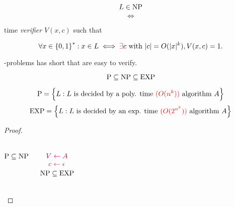 
\begin{frame}
  \begin{definition}[\np]
	\[
	  L \in \text{NP}
	\]
	\[
	  \iff
	\]
	\begin{center}
	  \red{$\exists$}  time \emph{verifier} $V(x,c)$ such that
	\end{center}
	\[
	  \forall x \in \left\{ 0,1 \right\}^{\ast}: x \in L \iff \textcolor{red}{\exists} c \text{ with } |c| = O(|x|^{k}), V(x,c) = 1.
	\]
  \end{definition}

  \vspace{0.50cm}
  \begin{center}
	{\large \np-problems has short  that are easy to verify.}
  \end{center}
\end{frame}

\begin{frame}
  \begin{theorem}
	\[
	  \text{P}{} \subseteq \text{NP}{} \subseteq \text{EXP}{}
	\]
  \end{theorem}

  \pause
  \[
	\text{P} = \Big\{ L: L \text{ is decided by a poly. time \textcolor{red}{($O(n^k)$)} algorithm } A \Big\}
  \]
  \[
	\text{EXP} = \Big\{ L: L \text{ is decided by an exp. time \textcolor{red}{($O(2^{n^{k}})$)} algorithm } A \Big\}
  \]

  \pause
  \begin{proof}
	\begin{columns}
		\pause
		\[
		  \text{P}{} \subseteq \text{NP}{}
		\]

		\pause
		\[
		  \textcolor{purple}{V \gets A}
		\]
		\[
		  \textcolor{purple}{c \gets \epsilon}
		\]
		\pause
		\[
		  \text{NP}{} \subseteq \text{EXP}{}
		\]

		\pause
		\begin{center}
		\end{center}
	\end{columns}
  \end{proof}
\end{frame}

\begin{frame}
\end{frame}

